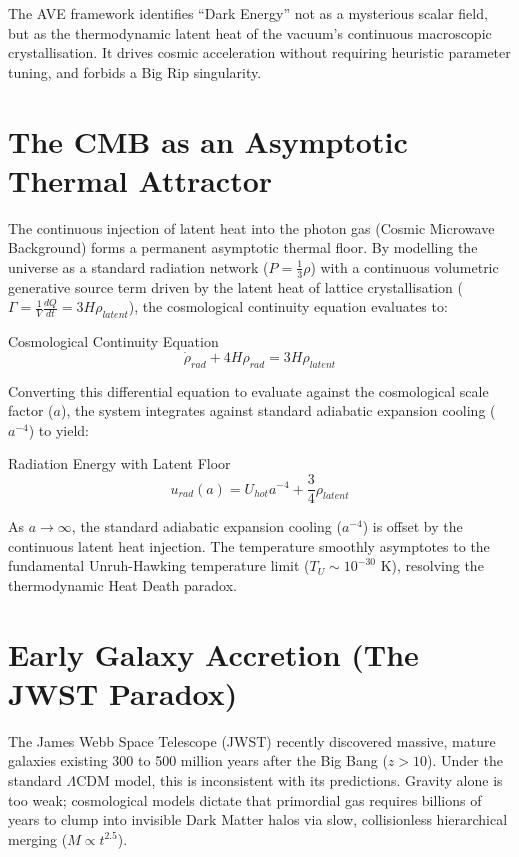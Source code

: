 The AVE framework identifies ``Dark Energy'' not as a mysterious scalar field, but as the
thermodynamic latent heat of the vacuum's continuous macroscopic crystallisation. It drives cosmic acceleration without requiring heuristic parameter tuning, and forbids a Big Rip singularity.

\section{The CMB as an Asymptotic Thermal Attractor}

The continuous injection of latent heat into the photon gas (Cosmic Microwave Background) forms a permanent asymptotic thermal floor. By modelling the universe as a standard radiation network ($P = \frac{1}{3}\rho$) with a continuous volumetric generative source term driven by the latent heat of lattice crystallisation ($\Gamma = \frac{1}{V}\frac{dQ}{dt} = 3H\rho_{latent}$), the cosmological continuity equation evaluates to:

\begin{resultbox}{Cosmological Continuity Equation}
\begin{equation}
\dot{\rho}_{rad} + 4H\rho_{rad} = 3H\rho_{latent}
\end{equation}
\end{resultbox}

Converting this differential equation to evaluate against the cosmological scale factor ($a$), the system integrates against standard adiabatic expansion cooling ($a^{-4}$) to yield:

\begin{resultbox}{Radiation Energy with Latent Floor}
\begin{equation}
u_{rad}(a) = U_{hot}a^{-4} + \frac{3}{4}\rho_{latent}
\end{equation}
\end{resultbox}

As $a \to \infty$, the standard adiabatic expansion cooling ($a^{-4}$) is offset by the continuous latent heat injection. The temperature smoothly asymptotes to the fundamental Unruh-Hawking temperature limit ($T_U \sim 10^{-30}\text{ K}$), resolving the thermodynamic Heat Death paradox.

\section{Early Galaxy Accretion (The JWST Paradox)}
The James Webb Space Telescope (JWST) recently discovered massive, mature galaxies existing 300 to 500 million years after the Big Bang ($z > 10$). Under the standard $\Lambda$CDM model, this is inconsistent with its predictions. Gravity alone is too weak; cosmological models dictate that primordial gas requires billions of years to clump into invisible Dark Matter halos via slow, collisionless hierarchical merging ($M \propto t^{2.5}$).


